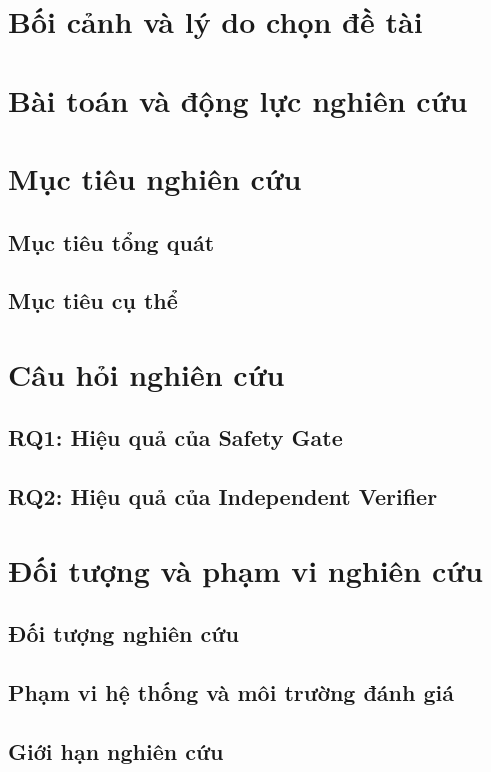 \section{Bối cảnh và lý do chọn đề tài}

\section{Bài toán và động lực nghiên cứu}

\section{Mục tiêu nghiên cứu}
\subsection{Mục tiêu tổng quát}
\subsection{Mục tiêu cụ thể}

\section{Câu hỏi nghiên cứu}
\subsection{RQ1: Hiệu quả của Safety Gate}
\subsection{RQ2: Hiệu quả của Independent Verifier}

\section{Đối tượng và phạm vi nghiên cứu}
\subsection{Đối tượng nghiên cứu}
\subsection{Phạm vi hệ thống và môi trường đánh giá}
\subsection{Giới hạn nghiên cứu}

